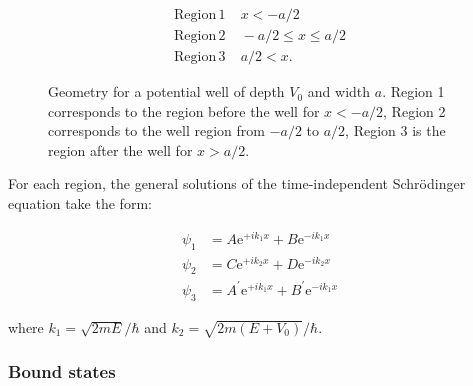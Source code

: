 \documentclass[
  a4paper,
]{book}
\begin{document}
\[
\begin{aligned}
\mathrm{Region \, 1} & \;  x < -a/2\\
\mathrm{Region \, 2} & \;  -a/2 \le x \le a/2\\
\mathrm{Region \, 3} & \;  a/2 < x \mathrm{.}
\end{aligned}
\]

\begin{figure}


\caption{\label{fig-potential_well}Geometry for a potential well of
depth \(V_0\) and width \(a\). Region 1 corresponds to the region before
the well for \(x < -a/2\), Region 2 corresponds to the well region from
\(-a/2\) to \(a/2\), Region 3 is the region after the well for
\(x > a/2\).}

\end{figure}%

For each region, the general solutions of the time-independent
Schrödinger equation take the form:

\[
\begin{aligned}
\psi_1 & =  A \mathrm{e}^{+i k_1 x} + B \mathrm{e}^{-i k_1 x}\\
\psi_2 & =  C \mathrm{e}^{+i k_2 x} + D \mathrm{e}^{-i k_2 x}\\
\psi_3 & =  A^{\prime} \mathrm{e}^{+i k_1 x} + B^{\prime} \mathrm{e}^{-i k_1 x}
\end{aligned}
\]

where \(k_1 = \sqrt{2mE}/\hbar\) and \(k_2 = \sqrt{2m(E+V_0)}/\hbar\).

\subsubsection{Bound states}\label{bound-states}
\end{document}
